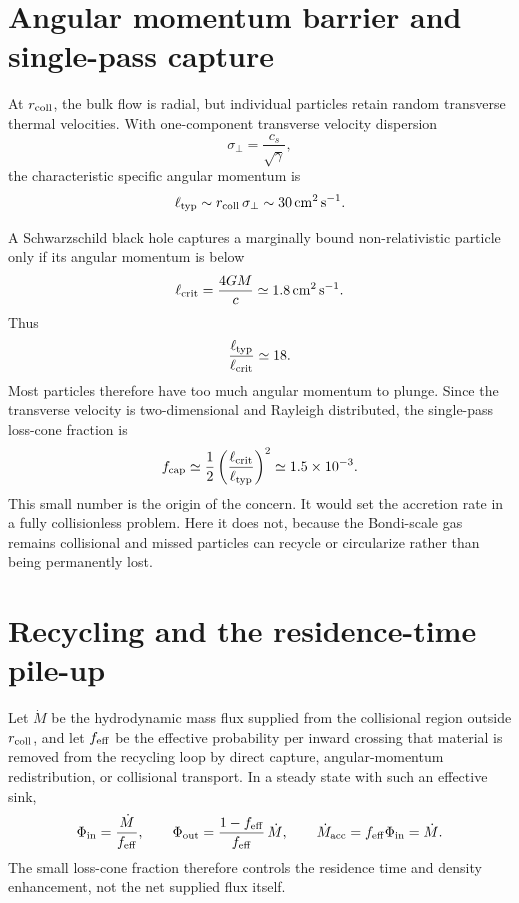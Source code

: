 \documentclass[12pt]{article}
\newcommand{\Mdot}{\dot{M}}
\newcommand{\rcoll}{r_{\rm coll}}
\newcommand{\lcrit}{\ell_{\rm crit}}
\newcommand{\ltyp}{\ell_{\rm typ}}
\newcommand{\feff}{f_{\rm eff}}
\begin{document}
\section{Angular momentum barrier and single-pass capture}
\label{app:losscone}

At $\rcoll$, the bulk flow is radial, but individual particles retain
random transverse thermal velocities. With one-component transverse
velocity dispersion
\begin{equation}
  \sigma_\perp = \frac{c_s}{\sqrt{\gamma}},
\end{equation}
the characteristic specific angular momentum is
\begin{equation}
  \ltyp \sim \rcoll\,\sigma_\perp
  \sim 30\,{\rm cm^2\,s^{-1}}.
\end{equation}

A Schwarzschild black hole captures a marginally bound non-relativistic
particle only if its angular momentum is below
\begin{equation}
  \lcrit = \frac{4GM}{c}
  \simeq 1.8\,{\rm cm^2\,s^{-1}}.
\end{equation}
Thus
\begin{equation}
  \frac{\ltyp}{\lcrit}\simeq18.
\end{equation}
Most particles therefore have too much angular momentum to plunge.
Since the transverse velocity is two-dimensional and Rayleigh
distributed, the single-pass loss-cone fraction is
\begin{equation}
  f_{\rm cap}
  \simeq \frac{1}{2}
  \left(\frac{\lcrit}{\ltyp}\right)^2
  \simeq 1.5\times10^{-3}.
  \label{eq:single_pass_capture}
\end{equation}
This small number is the origin of the concern. It would set the
accretion rate in a fully collisionless problem. Here it does not,
because the Bondi-scale gas remains collisional and missed particles can
recycle or circularize rather than being permanently lost.

\section{Recycling and the residence-time pile-up}
\label{app:recycling}

Let $\Mdot$ be the hydrodynamic mass flux supplied from the collisional
region outside $\rcoll$, and let $\feff$ be the effective probability
per inward crossing that material is removed from the recycling loop by
direct capture, angular-momentum redistribution, or collisional
transport. In a steady state with such an effective sink,
\begin{equation}
  \Phi_{\rm in}=\frac{\Mdot}{\feff},\qquad
  \Phi_{\rm out}=\frac{1-\feff}{\feff}\,\Mdot,
  \qquad
  \Mdot_{\rm acc}=\feff\Phi_{\rm in}=\Mdot.
  \label{eq:recycling_balance_rewrite}
\end{equation}
The small loss-cone fraction therefore controls the residence time and
density enhancement, not the net supplied flux itself.
\end{document}
